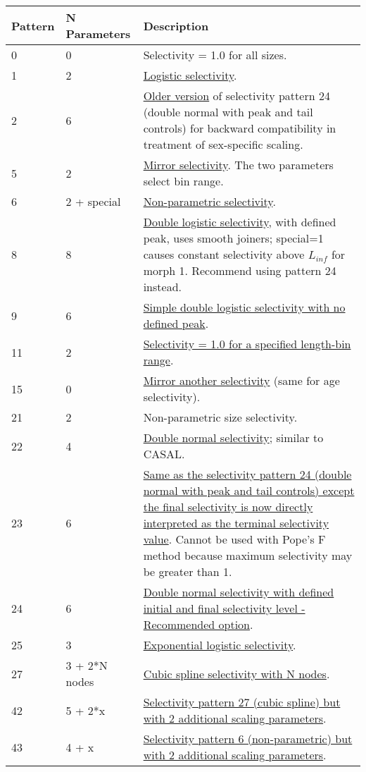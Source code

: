 \begin{longtable}{p{2cm} p{3cm} p{10cm}}
	Pattern & N Parameters & Description \Tstrut\Bstrut\\
	\hline
	0 \Tstrut & 0 & Selectivity = 1.0 for all sizes. \\
	1 \Tstrut & 2 & \hyperlink{LogisticSelectivity}{Logistic selectivity}. \\
	2 \Tstrut & 6 & \hyperlink{Pattern2}{Older version} of selectivity pattern 24 (double normal with peak and tail controls) for backward compatibility in treatment of sex-specific scaling. \\
	5 \Tstrut & 2 & \hyperlink{MirrorSelectivity}{Mirror selectivity}. The two parameters select bin range. \\
	6 \Tstrut & 2 + special & \hyperlink{NonParamSelectivity}{Non-parametric selectivity}. \\
	8 \Tstrut & 8 & \hyperlink{DoubleLogSelectivity}{Double logistic selectivity}, with defined peak, uses smooth joiners; special=1 causes constant selectivity above $L_{inf}$ for morph 1. Recommend using pattern 24 instead. \\
	9 \Tstrut & 6 & \hyperlink{SimpleDoubleLog}{Simple double logistic selectivity with no defined peak}. \\
	11 \Tstrut & 2 & \hyperlink{SelectivityOneRange}{Selectivity = 1.0 for a specified length-bin range}. \\
	15 \Tstrut & 0 & \hyperlink{MirrorAnotherSelectivity}{Mirror another selectivity} (same for age selectivity). \\
	21 \Tstrut & 2 & Non-parametric size selectivity. \\
	22 \Tstrut & 4 & \hyperlink{DoubleNormalPlateau}{Double normal selectivity}; similar to CASAL. \\
	23 \Tstrut & 6 & \hyperlink{DoubleNormalPeak}{Same as the selectivity pattern 24 (double normal with peak and tail controls) except the final selectivity is now directly interpreted as the terminal selectivity value}. Cannot be used with Pope's F method because maximum selectivity may be greater than 1. \\
	24 \Tstrut & 6 & \hyperlink{DoubleNormalPeak}{Double normal selectivity with defined initial and final selectivity level - Recommended option}. \\
	25 \Tstrut & 3 & \hyperlink{ExponentialLogistic}{Exponential logistic selectivity}. \\
	27 \Tstrut & 3 + 2*N nodes & \hyperlink{cubic-spline}{Cubic spline selectivity with N nodes}. \\
	42 \Tstrut & 5 + 2*x & \hyperlink{CubicSplineScaling}{Selectivity pattern 27 (cubic spline) but with 2 additional scaling parameters}. \\
	43 \Tstrut & 4 + x & \hyperlink{NonParamScaling}{Selectivity pattern 6 (non-parametric) but with 2 additional scaling parameters}. \Bstrut\\
	\hline
\end{longtable}


